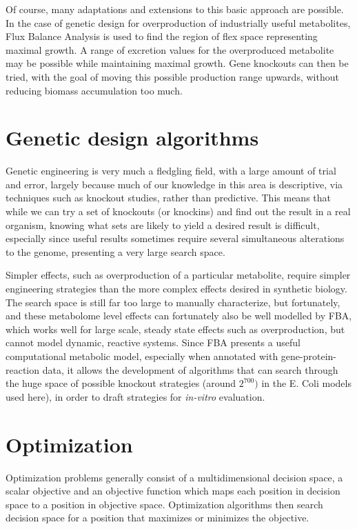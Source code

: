 Of course, many adaptations and extensions to this basic approach are possible. 
In the case of genetic design for overproduction of industrially useful metabolites, Flux Balance Analysis is used to find the region of flex space representing maximal growth. A range of excretion values for the overproduced metabolite may be possible while maintaining maximal growth. Gene knockouts can then be tried, with the goal of moving this possible production range upwards, without reducing biomass accumulation too much.

\section{Genetic design algorithms}
Genetic engineering is very much a fledgling field, with a large amount of trial and error, largely because much of our knowledge in this area is descriptive, via techniques such as knockout studies, rather than predictive. 
This means that while we can try a set of knockouts (or knockins) and find out the result in a real organism, knowing what sets are likely to yield a desired result is difficult, especially since useful results sometimes require several simultaneous alterations to the genome, presenting a very large search space.

Simpler effects, such as overproduction of a particular metabolite, require simpler engineering strategies than the more complex effects desired in synthetic biology. The search space is still far too large to manually characterize, but fortunately, and these metabolome level effects can fortunately also be well modelled by FBA, which works well for large scale, steady state effects such as overproduction, but cannot model dynamic, reactive systems. Since FBA presents a useful computational metabolic model, especially when annotated with gene-protein-reaction data, it allows the development of algorithms that can search through the huge space of possible knockout strategies (around \(2^700)\) in the E. Coli models used here), in order to draft strategies for \emph{in-vitro} evaluation.

\section{Optimization}

Optimization problems generally consist of a multidimensional decision space, a scalar objective and an objective function which maps each position in decision space to a position in objective space. 
Optimization algorithms then search decision space for a position that maximizes or minimizes the objective. 

